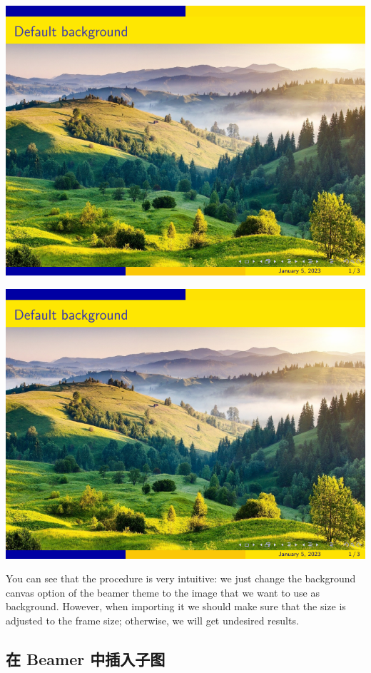 \begin{column}{0.5\textwidth}
\includegraphics[page=1]{examples/beamer/beamerfigure11.pdf}

\includegraphics[page=2]{examples/beamer/beamerfigure11.pdf}

You can see that the procedure is very intuitive: we just change the background canvas option of the beamer theme to the image that we want to use as background. However, when importing it we should make sure that the size is adjusted to the frame size; otherwise, we will get undesired results.

\subsection{在 Beamer 中插入子图}


\end{column}
